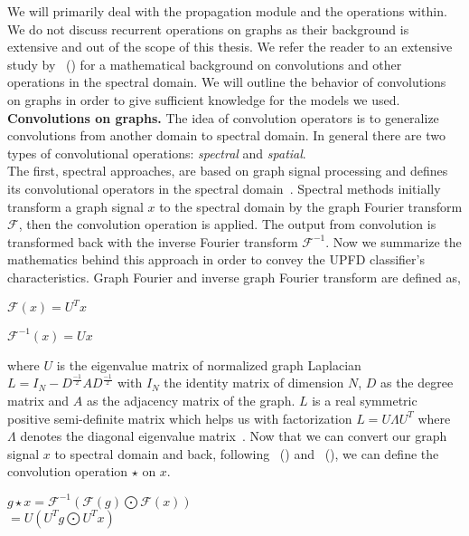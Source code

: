 We will primarily deal with the propagation module and the operations within. We do not discuss recurrent operations on graphs as their background is extensive and out of the scope of this thesis. We refer the reader to an extensive study by~\citeauthor{GNNsAReview_Zhou} (\citeyear{GNNsAReview_Zhou}) for a mathematical background on convolutions and other operations in the spectral domain. We will outline the behavior of convolutions on graphs in order to give sufficient knowledge for the models we used.\\
\textbf{Convolutions on graphs.} The idea of convolution operators is to generalize convolutions from another domain to spectral domain. In general there are two types of convolutional operations: \emph{spectral} and \emph{spatial}.\\
The first, spectral approaches, are based on graph signal processing and defines its convolutional operators in the spectral domain~\parencite{TheEmergingFieldOfSignalProcessingOnGraphs_Shuman}. Spectral methods initially transform a graph signal $x$ to the spectral domain by the graph Fourier transform $\mathcal{F}$, then the convolution operation is applied. The output from convolution is transformed back with the inverse Fourier transform $\mathcal{F}^{-1}$. Now we summarize the mathematics behind this approach in order to convey the UPFD classifier's characteristics. Graph Fourier and inverse graph Fourier transform are defined as,
\begin{center}
    $\mathcal{F}(x) = U^T x$
\end{center}
\begin{center}
    $\mathcal{F}^{-1}(x) = Ux$
\end{center}
where $U$ is the eigenvalue matrix of normalized graph Laplacian $L = I_N - D^{\frac{-1}{2}} A D^{\frac{-1}{2}}$ with $I_N$ the identity matrix of dimension $N$, $D$ as the degree matrix and $A$ as the adjacency matrix of the graph. $L$ is a real symmetric positive semi-definite matrix which helps us with factorization $L = U \Lambda U^T$ where $\Lambda$ denotes the diagonal eigenvalue matrix~\parencite{GNNsAReview_Zhou}. Now that we can convert our graph signal $x$ to spectral domain and back, following~\citeauthor{AWaveletTourOfSignalProcessing_Mallat} (\citeyear{AWaveletTourOfSignalProcessing_Mallat}) and~\citeauthor{GNNsAReview_Zhou} (\citeyear{GNNsAReview_Zhou}), we can define the convolution operation $\star$ on $x$.
\begin{center}
    $g \star x = \mathcal{F}^{-1}(\mathcal{F}(g) \bigodot \mathcal{F}(x))$ \\ $= U(U^T g \bigodot U^T x)$
\end{center}
